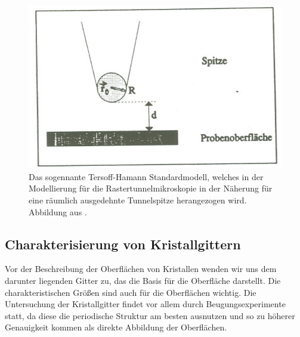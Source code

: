 \begin{figure}
    \includegraphics[width=14cm]{pics/tersoff_hamann}
    \caption{Das sogennante Tersoff-Hamann Standardmodell, welches in
        der Modellierung für die Rastertunnelmikroskopie in der Näherung
        für eine räumlich ausgedehnte Tunnelspitze herangezogen wird.
        Abbildung aus \cite{staatsexamen}.}
\label{fig:tersoff_hamann}
\end{figure}

\subsection{Charakterisierung von Kristallgittern}
Vor der Beschreibung der Oberflächen von Kristallen wenden wir uns dem darunter liegenden 
Gitter zu, das die Basis für die Oberfläche darstellt. Die charakteristischen Größen 
sind auch für die Oberflächen wichtig. Die Untersuchung der Kristallgitter findet vor 
allem durch Beugungsexperimente statt, da diese die periodische Struktur am besten 
ausnutzen und so zu höherer Genauigkeit kommen als direkte Abbildung der Oberflächen. 

